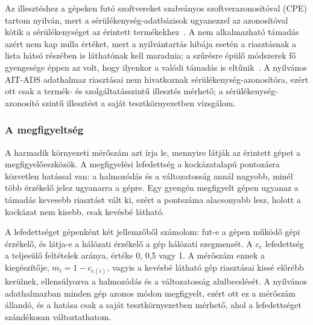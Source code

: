 Az illesztéshez a gépeken futó szoftvereket szabványos szoftverazonosítóval (\ac{CPE}) tartom nyilván, mert a sérülékenység-adatbázisok ugyanezzel az azonosítóval kötik a sérülékenységet az érintett termékekhez~\cite{shi2024cpe}. A nem alkalmazható támadás azért nem kap nulla értéket, mert a nyilvántartás hibája esetén a riasztásnak a lista hátsó részében is láthatónak kell maradnia; a szűrésre épülő módszerek fő gyengesége éppen az volt, hogy ilyenkor a valódi támadás is eltűnik~\cite{njogu2012,sommestad2015}. A nyilvános AIT-ADS adathalmaz riasztásai nem hivatkoznak sérülékenység-azonosítóra, ezért ott csak a termék- és szolgáltatásszintű illesztés mérhető; a sérülékenység-azonosító szintű illesztést a saját tesztkörnyezetben vizsgálom.

\subsubsection{A megfigyeltség}
A harmadik környezeti mérőszám azt írja le, mennyire látják az érintett gépet a megfigyelőeszközök. A megfigyelési lefedettség a kockázatalapú pontozásra közvetlen hatással van: a halmozódás és a változatosság annál nagyobb, minél több érzékelő jelez ugyanarra a gépre. Egy gyengén megfigyelt gépen ugyanaz a támadás kevesebb riasztást vált ki, ezért a pontszáma alacsonyabb lesz, holott a kockázat nem kisebb, csak kevésbé látható.

A lefedettséget gépenként két jellemzőből számolom: fut-e a gépen működő gépi érzékelő, és látja-e a hálózati érzékelő a gép hálózati szegmensét. A $c_e$ lefedettség a teljesülő feltételek aránya, értéke 0, 0,5 vagy 1. A mérőszám ennek a kiegészítője, $m_i = 1 - c_{e(i)}$, vagyis a kevésbé látható gép riasztásai kissé előrébb kerülnek, ellensúlyozva a halmozódás és a változatosság alulbecslését. A nyilvános adathalmazban minden gép azonos módon megfigyelt, ezért ott ez a mérőszám állandó, és a hatása csak a saját tesztkörnyezetben mérhető, ahol a lefedettséget szándékosan változtathatom.

